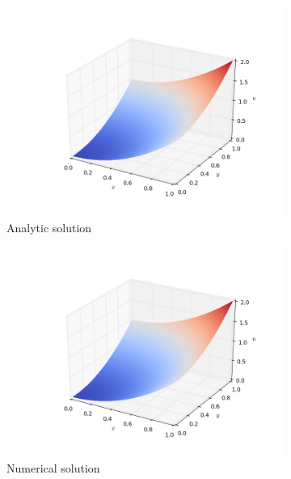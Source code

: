 \documentclass[11pt]{report}
\begin{document}
\begin{figure}[h!]
\centering
\begin{subfigure}{0.5\textwidth}
  \centering
  \includegraphics[width=1.0\linewidth]{images/example2_analytic}
  \caption{Analytic solution}
  \label{fig:sub2.1}
\end{subfigure}%
\begin{subfigure}{0.5\textwidth}
  \centering
  \includegraphics[width=1.0\linewidth]{images/example2_numerical}
  \caption{Numerical solution}
  \label{fig:sub2.2}
\end{subfigure}
\begin{subfigure}{0.6\textwidth}
  \centering

\end{subfigure}
\end{figure}
\end{document}
